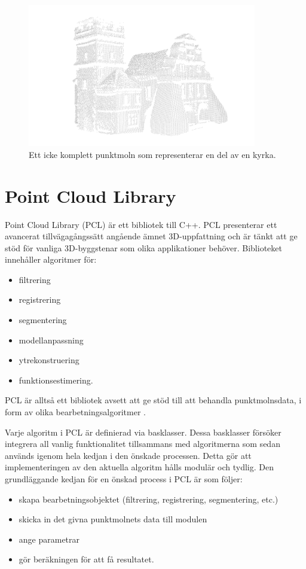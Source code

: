 \begin{figure}[H]
	\centering
	\includegraphics[width=100mm]{figures/icke_komplett_moln_kyrka.png}
	\caption{Ett icke komplett punktmoln som representerar en del av en kyrka.}
	\label{fig:point_cloud_church}
\end{figure}

\section{Point Cloud Library}
Point Cloud Library (PCL) är ett bibliotek till C++. PCL presenterar ett avancerat tillvägagångssätt angående ämnet 3D-uppfattning och är tänkt att ge stöd för vanliga 3D-byggstenar som olika applikationer behöver. Biblioteket innehåller algoritmer för:

\begin{itemize}
	\item filtrering
	\item registrering
	\item segmentering
	\item modellanpassning
	\item ytrekonstruering
	\item funktionsestimering.
\end{itemize}
PCL är alltså ett bibliotek avsett att ge stöd till att behandla punktmolnsdata, i form av olika bearbetningsalgoritmer \cite{rusu20113d}.

Varje algoritm i PCL är definierad via basklasser. Dessa basklasser försöker integrera all vanlig funktionalitet tillsammans med algoritmerna som sedan används igenom hela kedjan i den önskade processen. Detta gör att implementeringen av den aktuella algoritm hålls modulär och tydlig. Den grundläggande kedjan för en önskad process i PCL är som följer:

\begin{itemize}
	\item skapa bearbetningsobjektet (filtrering, registrering, segmentering, etc.)
	\item skicka in det givna punktmolnets data till modulen
	\item ange parametrar
	\item gör beräkningen för att få resultatet.
\end{itemize}

